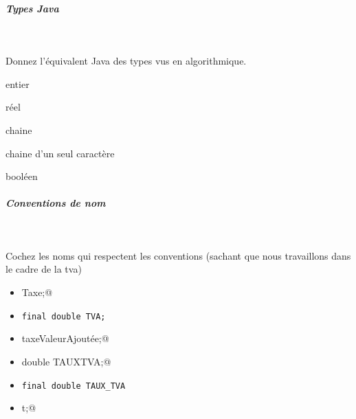 \documentclass[11pt,a4paper]{article}
\begin{document}
			
		\subparagraph{Types Java} 
		
                \textcolor{white}{.} \par
            
                  Donnez l'\'equivalent Java des types vus en algorithmique. 
                
            \par
         
                entier 		 \textcolor{gray}{\underline{\hspace*{2em}}} \par
				
                r\'eel   		 \textcolor{gray}{\underline{\hspace*{5em}}} \par
				
                chaine 		 \textcolor{gray}{\underline{\hspace*{5em}}} \par
				
                chaine d'un seul caract\`ere	 \textcolor{gray}{\underline{\hspace*{3em}}} \par
				
                bool\'een      \textcolor{gray}{\underline{\hspace*{5em}}} \par
				
			
		\subparagraph{Conventions de nom} 
		
                \textcolor{white}{.} \par
            Cochez les noms qui respectent les conventions (sachant que nous travaillons dans le cadre de la tva)
            \begin{itemize} 
        
            \item[ \ding{"6F} ] \verb@double Taxe;@
        
            \item[ \ding{"6F} ] \verb|final double TVA;|
        
            \item[ \ding{"6F} ] \verb@double taxeValeurAjoutée;@
        
            \item[ \ding{"6F} ] \verb@final double TAUXTVA;@
        
            \item[ \ding{"6F} ] \verb|final double TAUX_TVA|
        
            \item[ \ding{"6F} ] \verb@double t;@
        
            \end{itemize} 
        
\end{document}
